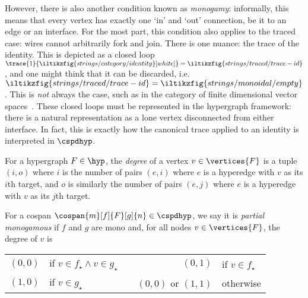 However, there is also another condition known as \emph{monogamy}: informally,
this means that every vertex has exactly one `in' and `out' connection, be it to
an edge or an interface.
For the most part, this condition also applies to the traced case: wires cannot
arbitrarily fork and join.
There is one nuance: the trace of the identity.
This is depicted as a closed loop \(
    \trace{1}{\iltikzfig{strings/category/identity}[white]}
    =
    \iltikzfig{strings/traced/trace-id}
\), and one might think that it can be discarded, i.e. \(
    \iltikzfig{strings/traced/trace-id}
    =
    \iltikzfig{strings/monoidal/empty}
\).
This is \emph{not} always the case, such as in the category of finite
dimensional vector spaces~\cite[Sec. 6.1]{hasegawa1997recursion}.
These closed loops must be represented in the hypergraph framework:
there is a natural representation as a lone vertex disconnected
from either interface.
In fact, this is exactly how the canonical trace applied to an identity is
interpreted in \(\cspdhyp\).

\begin{definition}
    For a hypergraph \(F \in \hyp\), the \emph{degree} of a vertex
    \(v \in \vertices{F}\) is a tuple \((i,o)\) where \(i\) is the number of
    pairs \((e,i)\) where \(e\) is a hyperedge with \(v\) as its \(i\)th target,
    and \(o\) is similarly the number of pairs \((e,j)\) where \(e\) is a
    hyperedge with \(v\) as its \(j\)th target.
\end{definition}

\begin{definition}
    For a cospan \(\cospan{m}[f]{F}[g]{n} \in \cspdhyp\), we say it is
    \emph{partial monogamous} if \(f\) and \(g\) are mono and, for all nodes
    \(v \in \vertices{F}\), the degree of \(v\) is

    \begin{center}
        \begin{tabular}{rlcrl}
            \((0,0)\)
            &
            if \(v \in f_\star \wedge v \in g_\star\)
            &
            \quad
            &
            \((0,1)\)
            &
            if \(v \in f_\star\)
            \\
            \((1,0)\)
            &
            if \(v \in g_\star\)
            &
            \quad
            &
            \((0,0)\)
            or \((1,1)\)
            &
            otherwise
        \end{tabular}
    \end{center}
\end{definition}

